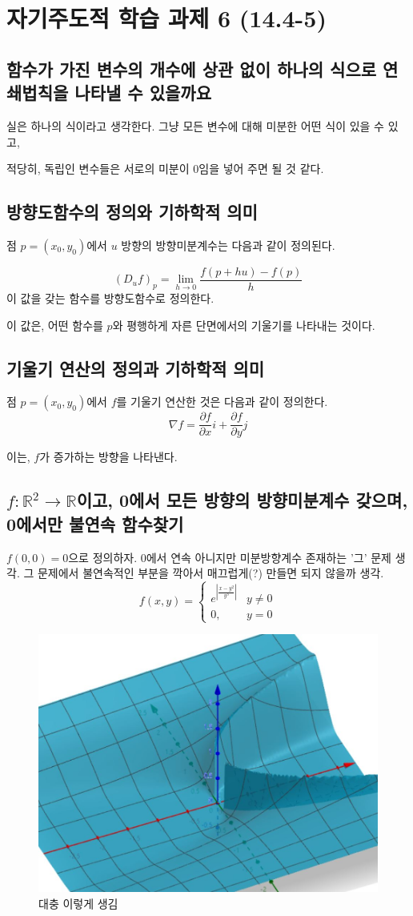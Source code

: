 \chapter{자기주도적 학습 과제 6 (14.4-5)}
\section{함수가 가진 변수의 개수에 상관 없이 하나의 식으로 연쇄법칙을 나타낼 수 있을까요}
실은 하나의 식이라고 생각한다. 그냥 모든 변수에 대해 미분한 어떤 식이 있을 수 있고,

적당히, 독립인 변수들은 서로의 미분이 0임을 넣어 주면 될 것 같다.

\section{방향도함수의 정의와 기하학적 의미}
점 $p=(x_0, y_0)$에서 $u$ 방향의 방향미분계수는 다음과 같이 정의된다.

$$(D_u f)_p = \lim_{h \to 0} \frac{f(p+hu) - f(p)}{h}$$
이 값을 갖는 함수를 방향도함수로 정의한다.

이 값은, 어떤 함수를 $p$와 평행하게 자른 단면에서의 기울기를 나타내는 것이다.

\section{기울기 연산의 정의과 기하학적 의미}
점 $p=(x_0, y_0)$에서 $f$를 기울기 연산한 것은 다음과 같이 정의한다.
$$\nabla f  = \frac{\partial f}{\partial x}i + \frac{\partial f}{\partial y}j$$

이는, $f$가 증가하는 방향을 나타낸다.
\section{$f: \mathbb{R}^2 \to \mathbb{R}$이고, 0에서 모든 방향의 방향미분계수 갖으며, 0에서만 불연속 함수찾기}
$f(0,0)=0$으로 정의하자. 0에서 연속 아니지만 미분방향계수 존재하는 '그' 문제 생각. 그 문제에서 불연속적인 부분을 깍아서 매끄럽게(?) 만들면 되지 않을까 생각.
$$f(x,y) = \begin{cases}
    e^{\left|\frac{x-y^2}{y^3} \right|} & y \ne 0\\
    0, & y = 0
\end{cases}
$$


\begin{figure}[h!]
    \centering
    \includegraphics[width=.7\textwidth]{img/strange.JPG  }
    \caption{대충 이렇게 생김}
    \label{texlive:exdit}
\end{figure}

